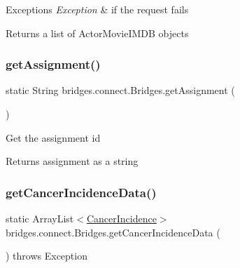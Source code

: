 \begin{DoxyExceptions}{Exceptions}
{\em Exception} & if the request fails\\
\hline
\end{DoxyExceptions}
\begin{DoxyReturn}{Returns}
a list of Actor\+Movie\+I\+M\+DB objects 
\end{DoxyReturn}
\mbox{\label{classbridges_1_1connect_1_1_bridges_af049c06c532987eb616156fb16ea2f43}} 
\subsubsection{\texorpdfstring{get\+Assignment()}{getAssignment()}}
{\footnotesize\ttfamily static String bridges.\+connect.\+Bridges.\+get\+Assignment (\begin{DoxyParamCaption}{ }\end{DoxyParamCaption})\hspace{0.3cm}{\ttfamily [static]}}

Get the assignment id

\begin{DoxyReturn}{Returns}
assignment as a string 
\end{DoxyReturn}
\mbox{\label{classbridges_1_1connect_1_1_bridges_ad3d3afcf9df9e2b87d069bc050029628}} 
\subsubsection{\texorpdfstring{get\+Cancer\+Incidence\+Data()}{getCancerIncidenceData()}}
{\footnotesize\ttfamily static Array\+List$<$\mbox{\hyperlink{classbridges_1_1data__src__dependent_1_1_cancer_incidence}{Cancer\+Incidence}}$>$ bridges.\+connect.\+Bridges.\+get\+Cancer\+Incidence\+Data (\begin{DoxyParamCaption}{ }\end{DoxyParamCaption}) throws Exception\hspace{0.3cm}{\ttfamily [static]}}

